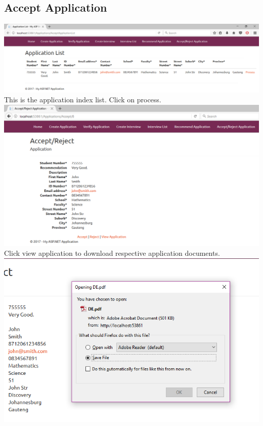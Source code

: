 \documentclass{article}
\begin{document}
\subsection{Accept Application}
\begin{center}
\includegraphics[scale=0.45]{AcceptApplication.png}\\
This is the application index list. Click on process. \\ \bigskip
\includegraphics[scale=0.5]{AcceptApplication2.png}\\
Click view application to download respective application documents.\\ \bigskip
\includegraphics[scale=0.5]{AcceptApplication3.png}\\

\end{center}
\end{document}
